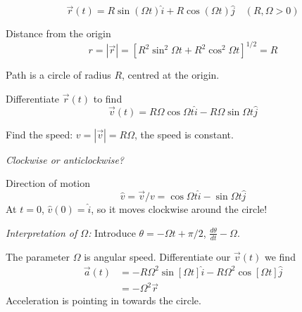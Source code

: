\documentclass[10pt]{scrartcl}
\begin{document}
\begin{example}
\[\vec{r}(t) = R\sin(\Omega t)\hat{i} + R\cos(\Omega t)\hat{j}\quad (R,\Omega >0)\]

Distance from the origin 
\[r = |\vec{r}| = [R^2\sin^2\Omega t + R^2\cos^2\Omega t]^{1/2} = R\]

Path is a circle of radius $R$, centred at the origin. 

\begin{center}
\end{center}

Differentiate $\vec{r}(t)$ to find 
\[\vec{v}(t) = R\Omega \cos \Omega t\hat{i} - R\Omega \sin \Omega t \hat{j}\]

Find the speed: $v = |\vec{v}| = R\Omega$, the speed is constant. 

\emph{Clockwise or anticlockwise?}

Direction of motion
\[\hat{v}= \vec{v}/v = \cos \Omega t\hat{i} - \sin\Omega t \hat{j}\]
At $t = 0$, $\hat{v}(0) = \hat{i}$, so it moves clockwise around the circle!

\emph{Interpretation of $\Omega$:} Introduce $\theta = -\Omega t + \pi/2$, $\frac{d\theta}{dt} - \Omega$. 

The parameter $\Omega$ is angular speed. Differentiate our $\vec{v}(t)$ we find
\[\begin{aligned}
\vec{a}(t) &= -R\Omega^2 \sin[\Omega t]\hat{i} - R\Omega^2\cos[\Omega t]\hat{j}\\
&= -\Omega^2 \vec{r}	
\end{aligned}
\]
Acceleration is pointing in towards the circle. 
\end{example}
\end{document}
